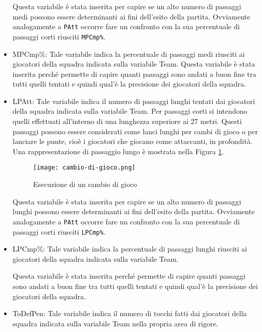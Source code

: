\begin{itemize}
	Questa variabile è stata inserita per capire se un alto numero di passaggi medi possono essere determinanti ai fini dell'esito della partita. Ovviamente analogamente a \texttt{PAtt} occorre fare un confronto con la sua percentuale di passaggi corti riusciti \texttt{MPCmp\%}.

	\item \textsf{MPCmp\%}: Tale variabile indica la percentuale di passaggi medi riusciti ai giocatori della squadra indicata sulla variabile \textsf{Team}. Questa variabile è stata inserita perché permette di capire quanti passaggi sono andati a buon fine tra tutti quelli tentati e quindi qual'è la precisione dei giocatori della squadra.
	\item \textsf{LPAtt}: Tale variabile indica il numero di passaggi lunghi tentati dai giocatori della squadra indicata sulla variabile \textsf{Team}. Per passaggi corti si intendono quelli effettuati all'interno di una lunghezza superiore ai 27 metri. Questi passaggi possono essere considerati come lanci lunghi per cambi di gioco o per lanciare le punte, cioè i giocatori che giocano come attaccanti, in profondità. Una rappresentazione di passaggio lungo è mostrata nella Figura \ref{fig:cambio}.
	\begin{figure}[h]
		\begin{center}
			\texttt{[image: cambio-di-gioco.png]}
			\caption{Esecuzione di un cambio di gioco} \label{fig:cambio}
		\end{center}
	\end{figure}
	
	Questa variabile è stata inserita per capire se un alto numero di passaggi lunghi possono essere determinanti ai fini dell'esito della partita. Ovviamente analogamente a \texttt{PAtt} occorre fare un confronto con la sua percentuale di passaggi corti riusciti \texttt{LPCmp\%}.

	\item \textsf{LPCmp\%}: Tale variabile indica la percentuale di passaggi lunghi riusciti ai giocatori della squadra indicata sulla variabile \textsf{Team}. 
	
	Questa variabile è stata inserita perché permette di capire quanti passaggi sono andati a buon fine tra tutti quelli tentati e quindi qual'è la precisione dei giocatori della squadra.
	\item \textsf{ToDefPen}: Tale variabile indica il numero di tocchi fatti dai giocatori della squadra indicata sulla variabile \textsf{Team} nella propria area di rigore. 
	

\end{itemize}
